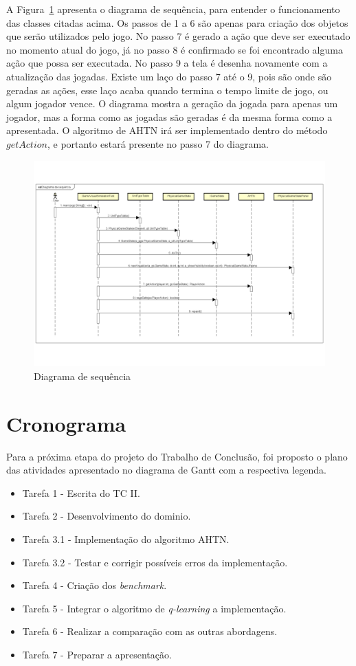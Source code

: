 A Figura~\ref{fig:sequencia} apresenta o diagrama de sequência, para entender o funcionamento das classes citadas acima. Os passos de 1 a 6 são apenas para criação dos objetos que serão utilizados pelo jogo. No passo 7 é gerado a ação que deve ser executado no momento atual do jogo, já no passo 8 é confirmado se foi encontrado alguma ação que possa ser executada. No passo 9 a tela é desenha novamente com a atualização das jogadas. Existe um laço do passo 7 até o 9, pois são onde são geradas as ações, esse laço acaba quando termina o tempo limite de jogo, ou algum jogador vence. O diagrama mostra a geração da jogada para apenas um jogador, mas a forma como as jogadas são geradas é da mesma forma como a apresentada. O algoritmo de AHTN irá ser implementado dentro do método $getAction$, e portanto estará presente no passo 7 do diagrama.

\begin{figure}[ht]
  	\centering
  	\includegraphics[width=1\textwidth]{fig/diagramaSequencia.pdf}
  	\caption{Diagrama de sequência}
  	\label{fig:sequencia}
\end{figure}


\section{Cronograma}

Para a próxima etapa do projeto do Trabalho de Conclusão, foi proposto o plano das atividades apresentado no diagrama de Gantt com a respectiva legenda.

\begin{itemize}
\item Tarefa 1 - Escrita do TC II.
\item Tarefa 2 - Desenvolvimento do dominio.
\item Tarefa 3.1 - Implementação do algoritmo AHTN.
\item Tarefa 3.2 - Testar e corrigir possíveis erros da implementação.
\item Tarefa 4 - Criação dos \textit{benchmark}.
\item Tarefa 5 - Integrar o algoritmo de \textit{q-learning} a implementação. 
\item Tarefa 6 - Realizar a comparação com as outras abordagens. 
\item Tarefa 7 - Preparar a apresentação. 
\end{itemize}

